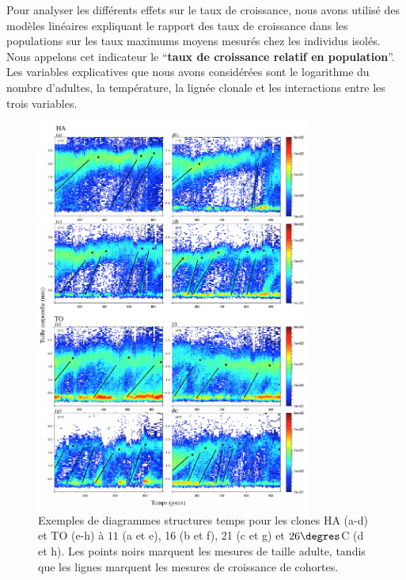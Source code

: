 Pour analyser les différents effets sur le taux de croissance, nous avons
utilisé des modèles linéaires expliquant le rapport des taux de croissance dans
les populations sur les taux maximums moyens mesurés chez les individus isolés.
Nous appelons cet indicateur le ``\textbf{taux de croissance relatif en
population}''. Les variables explicatives que nous avons considérées sont le
logarithme du nombre d'adultes, la température, la lignée clonale et les
interactions entre les trois variables. 

\begin{figure}[H]
\begin{center}
\includegraphics[width=0.8\textwidth]{1_CorpsDeThese/Resumes/Fig/FIP02}
\caption[Exemples de diagrammes
structures temps]{Exemples de diagrammes
structures temps pour les clones HA
(a-d) et TO (e-h) à $11$ (a et e), 16 (b et f), 21 (c et g) et $26\degres$C
(d et h). Les points noirs marquent les mesures de taille
adulte, tandis que les lignes marquent les mesures de
croissance de cohortes.}
\label{fig:FIP2}
\end{center}
\end{figure}

